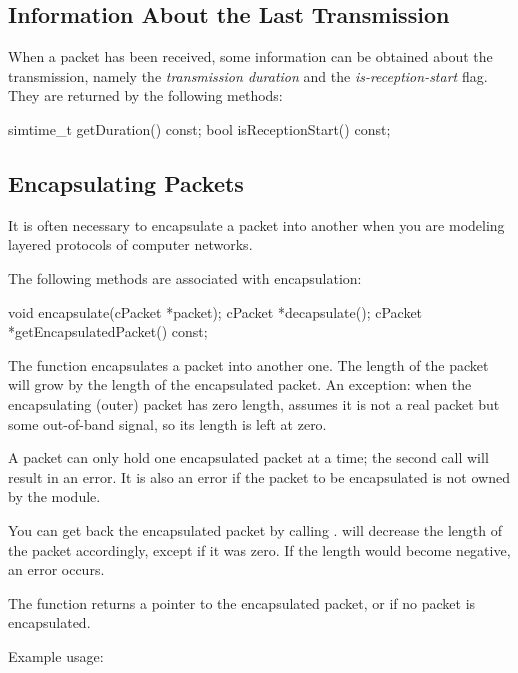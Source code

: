 \subsection{Information About the Last Transmission}

When a packet has been received, some information can be obtained
about the transmission, namely the \textit{transmission duration}
and the \textit{is-reception-start} flag. They are returned by
the following methods:

\begin{cpp}
simtime_t getDuration() const;
bool isReceptionStart() const;
\end{cpp}


\subsection{Encapsulating Packets}

It is often necessary to encapsulate a packet
into another when you are modeling layered protocols of computer networks.

The following  methods are associated with encapsulation:

\begin{cpp}
void encapsulate(cPacket *packet);
cPacket *decapsulate();
cPacket *getEncapsulatedPacket() const;
\end{cpp}

The  function encapsulates a packet into another one.
The length of the packet will grow by the length of the encapsulated
packet. An exception: when the encapsulating (outer) packet has zero
length, {\opp} assumes it is not a real packet but some out-of-band signal,
so its length is left at zero.

A packet can only hold one encapsulated packet at a time; the second
 call will result in an error. It is also an error if
the packet to be encapsulated is not owned by the module.

You can get back the encapsulated packet by calling .
 will decrease the length of the packet accordingly,
except if it was zero. If the length would become negative, an error
occurs.

The  function returns a pointer to the
encapsulated packet, or  if no packet is encapsulated.

Example usage:

